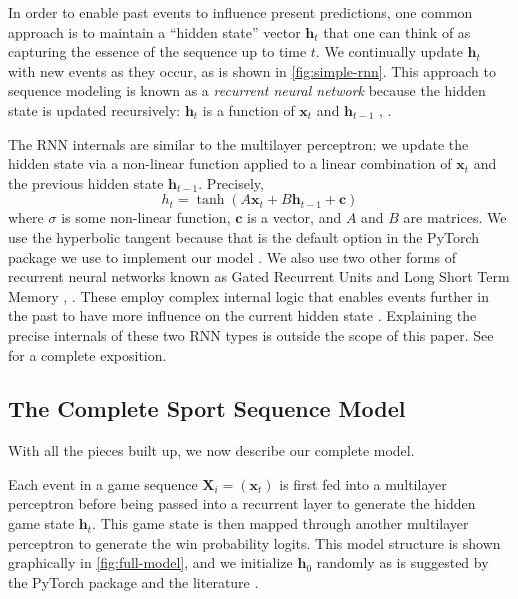 In order to enable past events to influence present predictions, one common approach is to maintain a ``hidden state'' vector $\mathbf h_t$ that one can think of as capturing the essence of the sequence up to time $t$. We continually update $\mathbf h_t$ with new events as they occur, as is shown in \autoref{fig:simple-rnn}.
This approach to sequence modeling is known as a \emph{recurrent neural network} because the hidden state is updated recursively: $\mathbf h_t$ is a function of $\mathbf x_t$ and $\mathbf h_{t-1}$ \cite[\S 10.5]{ISL}, \cite[\S 15]{PML}.

The RNN internals are similar to the multilayer perceptron: we update the hidden state via a non-linear function applied to a linear combination of $\mathbf x_t$ and the previous hidden state $\mathbf h_{t-1}$. Precisely,
\begin{equation}
	\label{eqn:elman-rnn}
	h_t = \tanh (A \mathbf x_t + B \mathbf h_{t-1} + \mathbf c)
\end{equation}
where $\sigma$ is some non-linear function, $\mathbf c$ is a vector, and $A$ and $B$ are matrices. We use the hyperbolic tangent because that is the default option in the PyTorch package we use to implement our model \cite{pytorch}. We also use two other forms of recurrent neural networks known as Gated Recurrent Units \cite[\S 15.2.7.1]{PML} and Long Short Term Memory \cite[\S 10.5.1]{ISL}, \cite[\S 15.2.7.2]{PML}. These employ complex internal logic that enables events further in the past to have more influence on the current hidden state \cite[\S 15.2.6]{PML}. Explaining the precise internals of these two RNN types is outside the scope of this paper. See \textcite[\S 15.2.7]{PML} for a complete exposition.

\subsection{The Complete Sport Sequence Model}
\label{sec:complete-model}

With all the pieces built up, we now describe our complete model.

Each event in a game sequence $\mathbf X_i = (\mathbf x_t)$ is first fed into a multilayer perceptron before being passed into a recurrent layer to generate the hidden game state $\mathbf h_t$. This game state is then mapped through another multilayer perceptron to generate the win probability logits. This model structure is shown graphically in \autoref{fig:full-model}, and we initialize $\mathbf h_0$ randomly as is suggested by the PyTorch package and the literature \cite{PML}.


